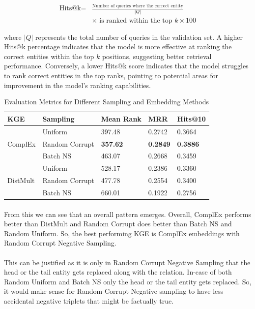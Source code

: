 \documentclass{article}
\begin{document}
\begin{itemize}
\begin{align*}
\text{Hits@k} = & \frac{\text{Number of queries where the correct entity}}{|Q|} \\
& \times \text{ is ranked within the top } k \times 100
\end{align*}


where \( |Q| \) represents the total number of queries in the validation set. A higher Hits@k percentage indicates that the model is more effective at ranking the correct entities within the top \( k \) positions, suggesting better retrieval performance. Conversely, a lower Hits@k score indicates that the model struggles to rank correct entities in the top ranks, pointing to potential areas for improvement in the model's ranking capabilities.

\end{itemize}

\begin{table}[htbp]
\centering
\caption{Evaluation Metrics for Different Sampling and Embedding Methods}
\label{tab:evaluation_metrics}
\begin{tabular}{@{}lllll@{}}
\toprule
KGE & Sampling & Mean Rank & MRR & Hits@10 \\
\midrule
\multirow{3}{*}{ComplEx} & Uniform & 397.48 & 0.2742 & 0.3664 \\
 & Random Corrupt & \textbf{357.62} & \textbf{0.2849} & \textbf{0.3886} \\
 & Batch NS & 463.07 & 0.2668 & 0.3459 \\
\midrule
\multirow{3}{*}{DistMult} & Uniform & 528.17 & 0.2386 & 0.3360 \\
 & Random Corrupt & 477.78 & 0.2554 & 0.3400 \\
 & Batch NS & 660.01 & 0.1922 &  0.2756 \\
\bottomrule
\end{tabular}
\end{table}

\paragraph{}From this we can see that an overall pattern emerges. Overall, ComplEx performs better than DistMult and Random Corrupt does better than Batch NS and Random Uniform. So, the best performing KGE is ComplEx embeddings with Random Corrupt Negative Sampling. 

\paragraph{}This can be justified as it is only in Random Corrupt Negative Sampling that the head or the tail entity gets replaced along with the relation. In-case of both Random Uniform and Batch NS only the head or the tail entity gets replaced. So, it would make sense for Random Corrupt Negative sampling to have less accidental negative triplets that might be factually true. 
\end{document}
